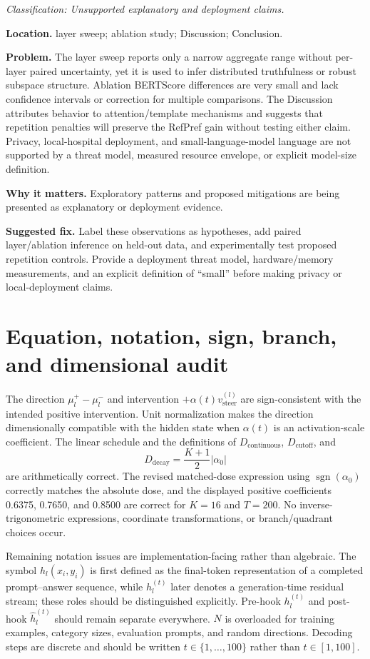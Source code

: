 \documentclass[11pt]{article}
\newcommand{\findinglabel}[1]{\textbf{#1}}
\newcommand{\classification}[1]{\textit{Classification: #1.}}
\begin{document}
\classification{Unsupported explanatory and deployment claims}

\findinglabel{Location.} layer sweep; ablation study; Discussion; Conclusion.

\findinglabel{Problem.} The layer sweep reports only a narrow aggregate range without per-layer paired uncertainty, yet it is used to infer distributed truthfulness or robust subspace structure.  Ablation BERTScore differences are very small and lack confidence intervals or correction for multiple comparisons.  The Discussion attributes behavior to attention/template mechanisms and suggests that repetition penalties will preserve the RefPref gain without testing either claim.  Privacy, local-hospital deployment, and small-language-model language are not supported by a threat model, measured resource envelope, or explicit model-size definition.

\findinglabel{Why it matters.} Exploratory patterns and proposed mitigations are being presented as explanatory or deployment evidence.

\findinglabel{Suggested fix.} Label these observations as hypotheses, add paired layer/ablation inference on held-out data, and experimentally test proposed repetition controls.  Provide a deployment threat model, hardware/memory measurements, and an explicit definition of ``small'' before making privacy or local-deployment claims.

\section*{Equation, notation, sign, branch, and dimensional audit}

The direction $\mu_l^+-\mu_l^-$ and intervention $+\alpha(t)v_{\text{steer}}^{(l)}$ are sign-consistent with the intended positive intervention.  Unit normalization makes the direction dimensionally compatible with the hidden state when $\alpha(t)$ is an activation-scale coefficient.  The linear schedule and the definitions of $D_{\text{continuous}}$, $D_{\text{cutoff}}$, and
\[
D_{\text{decay}}=\frac{K+1}{2}|\alpha_0|
\]
are arithmetically correct.  The revised matched-dose expression using $\operatorname{sgn}(\alpha_0)$ correctly matches the absolute dose, and the displayed positive coefficients 0.6375, 0.7650, and 0.8500 are correct for $K=16$ and $T=200$.  No inverse-trigonometric expressions, coordinate transformations, or branch/quadrant choices occur.

Remaining notation issues are implementation-facing rather than algebraic.  The symbol $h_l(x_i,y_i)$ is first defined as the final-token representation of a completed prompt--answer sequence, while $h_l^{(t)}$ later denotes a generation-time residual stream; these roles should be distinguished explicitly.  Pre-hook $h_l^{(t)}$ and post-hook $\hat h_l^{(t)}$ should remain separate everywhere.  $N$ is overloaded for training examples, category sizes, evaluation prompts, and random directions.  Decoding steps are discrete and should be written $t\in\{1,\ldots,100\}$ rather than $t\in[1,100]$.
\end{document}
